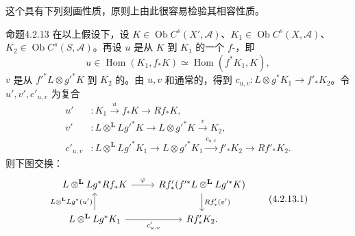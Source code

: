 这个具有下列刻画性质，原则上由此很容易检验其相容性质。
\begin{SGAresult}{命题}{4.2.13}
在以上假设下，设 $K\in\operatorname{Ob}C^s(X',\mathscr A)$、$K_1\in\operatorname{Ob}C^s(X,\mathscr A)$、$K_2\in\operatorname{Ob}C^s(S,\mathscr A)$。再设 $u$ 是从 $K$ 到 $K_1$ 的一个 $f$-，即
\[u\in\operatorname{Hom}(K_1,f_*K)\simeq\operatorname{Hom}(f^*K_1,K),\]
$v$ 是从 $f'^*L\otimes g'^*K$ 到 $K_2$ 的。由 $u,v$ 和通常的，得到 $c_{u,v}:L\otimes g^*K_1\to f'_*K_2$。令 $u',v',c'_{u,v}$ 为复合
\[
\begin{aligned}
u'&:K_1\xrightarrow{u}f_*K\longrightarrow Rf_*K,\\
v'&:L\otimes^{\mathbf L}Lg'^*K\longrightarrow L\otimes g'^*K\xrightarrow{v}K_2,\\
c'_{u,v}&:L\otimes^{\mathbf L}Lg'^*K_1\longrightarrow L\otimes g'^*K_1\xrightarrow{c_{u,v}}f'_*K_2\longrightarrow Rf'_*K_2.
\end{aligned}
\]
则下图交换：
\[\begin{tikzcd}L\otimes^{\mathbf L}Lg^*Rf_*K\arrow[r,"\varphi"]&Rf'_*(f'^*L\otimes^{\mathbf L}Lg'^*K)\arrow[d,"Rf'_*(v')"]\\L\otimes^{\mathbf L}Lg^*K_1\arrow[u,"{L\otimes^{\mathbf L}Lg^*(u')}"]\arrow[r,"{c'_{u,v}}"']&Rf'_*K_2.\end{tikzcd}\tag{4.2.13.1}\]
\end{SGAresult}
